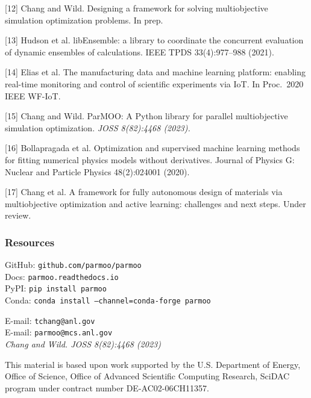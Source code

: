 \documentclass[aspectratio=169]{beamer}
\begin{document}
\begin{frame}
{[12]
Chang and Wild.
Designing a framework for solving multiobjective simulation optimization problems.
In prep.

\medskip

[13] Hudson et al.
libEnsemble: a library to coordinate the concurrent evaluation of dynamic ensembles of calculations.
IEEE TPDS 33(4):977--988 (2021).

\medskip

[14] Elias et al.
The manufacturing data and machine learning platform: enabling real-time monitoring and control of scientific experiments via IoT.
In Proc.\ 2020 IEEE WF-IoT.

\medskip

[15] Chang and Wild.
ParMOO: A Python library for parallel multiobjective simulation optimization.
{\sl JOSS 8(82):4468 (2023).}

\medskip

[16] Bollapragada et al.
Optimization and supervised machine learning methods for fitting numerical physics models without derivatives.
Journal of Physics G: Nuclear and Particle Physics 48(2):024001 (2020).

\medskip

[17] Chang et al.
A framework for fully autonomous design of materials via multiobjective optimization and active learning: challenges and next steps.
Under review.

}
\end{frame}

\begin{frame}\frametitle{Resources}
\begin{center}
{\large
GitHub: {\tt github.com/parmoo/parmoo}\\
Docs: {\tt parmoo.readthedocs.io}\\
PyPI: {\tt pip install parmoo}\\
Conda: {\tt conda install --channel=conda-forge parmoo}}

\bigskip
\bigskip

E-mail: {\tt tchang@anl.gov}\\
E-mail: {\tt parmoo@mcs.anl.gov}\\
\bigskip
\bigskip
{\sl Chang and Wild. JOSS 8(82):4468 (2023)}\\

\vfill

{\tiny This material is based upon work supported by the U.S. Department of Energy, Office of Science, Office of Advanced Scientific Computing Research, SciDAC program under contract number DE-AC02-06CH11357.\\}

\end{center}
\end{frame}
\end{document}
